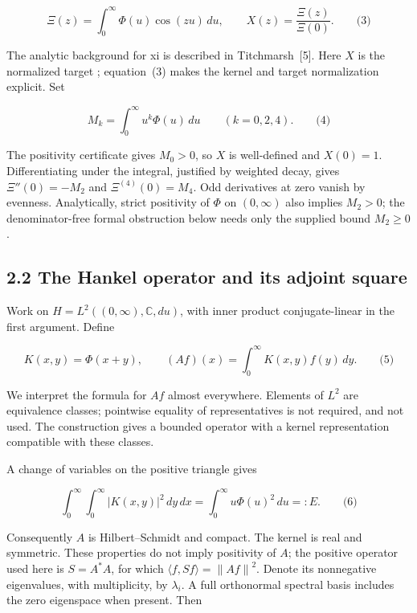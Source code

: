 \documentclass[
  11pt,
]{article}
\begin{document}
\[\Xi(z) = \int_{0}^{\infty}\Phi(u)\cos(zu)\, du,\quad\quad X(z) = \frac{\Xi(z)}{\Xi(0)}.\quad\quad\text{(3)}\]

The analytic background for xi is described in Titchmarsh~{[}5{]}. Here \(X\) is the normalized target \texttt{}; equation~(3) makes the kernel and target normalization explicit. Set

\[M_{k} = \int_{0}^{\infty}u^{k}\Phi(u)\, du\quad\quad(k = 0,2,4).\quad\quad\text{(4)}\]

The positivity certificate gives \(M_{0} > 0\), so \(X\) is well-defined and \(X(0) = 1\). Differentiating under the integral, justified by weighted decay, gives \(\Xi''(0) = - M_{2}\) and \(\Xi^{(4)}(0) = M_{4}\). Odd derivatives at zero vanish by evenness. Analytically, strict positivity of \(\Phi\) on \((0,\infty)\) also implies \(M_{2} > 0\); the denominator-free formal obstruction below needs only the supplied bound \(M_{2} \geq 0\).

\hypertarget{the-hankel-operator-and-its-adjoint-square}{%
\subsection{2.2 The Hankel operator and its adjoint square}\label{the-hankel-operator-and-its-adjoint-square}}

Work on \(H = L^{2}\left( (0,\infty),\mathbb{C},du \right)\), with inner product conjugate-linear in the first argument. Define

\[K(x,y) = \Phi(x + y),\quad\quad(Af)(x) = \int_{0}^{\infty}K(x,y)f(y)\, dy.\quad\quad\text{(5)}\]

We interpret the formula for \(Af\) almost everywhere. Elements of \(L^{2}\) are equivalence classes; pointwise equality of representatives is not required, and not used. The construction gives a bounded operator with a kernel representation compatible with these classes.

A change of variables on the positive triangle gives

\[\int_{0}^{\infty}{\int_{0}^{\infty}\left| K(x,y) \right|^{2}}\, dy\, dx = \int_{0}^{\infty}u\Phi(u)^{2}\, du = :E.\quad\quad\text{(6)}\]

Consequently \(A\) is Hilbert--Schmidt and compact. The kernel is real and symmetric. These properties do not imply positivity of \(A\); the positive operator used here is \(S = A^{*}A\), for which \(\langle f,Sf\rangle = {\parallel Af \parallel}^{2}\). Denote its nonnegative eigenvalues, with multiplicity, by \(\lambda_{i}\). A full orthonormal spectral basis includes the zero eigenspace when present. Then
\end{document}
